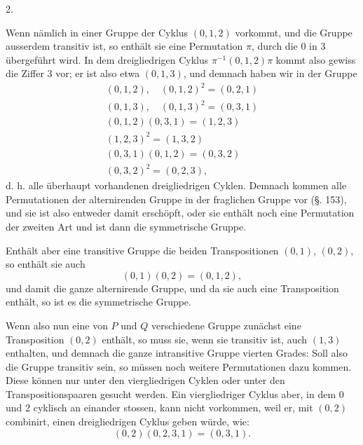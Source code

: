 
2. 

Wenn nämlich in einer Gruppe der Cyklus $(0,1,2)$ vorkommt, und die Gruppe ausserdem transitiv ist, so enthält sie eine Permutation $\pi$, durch die 0 in 3 übergeführt wird. In dem dreigliedrigen Cyklus $\pi^{-1}(0,1,2)\pi$ kommt also gewiss die Ziffer 3 vor; er ist also etwa $(0,1,3)$, und demnach haben wir in der Gruppe
\[
\begin{gathered}
(0,1,2), \quad (0,1,2)^2 = (0,2,1) \\
(0,1,3), \quad (0,1,3)^2 = (0,3,1) \\
(0,1,2)(0,3,1) = (1,2,3) \\
(1,2,3)^2 = (1,3,2) \\
(0,3,1)(0,1,2) = (0,3,2) \\
(0,3,2)^2 = (0,2,3),
\end{gathered}
\]
d. h. alle überhaupt vorhandenen dreigliedrigen Cyklen. Demnach kommen alle Permutationen der alternirenden Gruppe in der fraglichen Gruppe vor (§. 153), und sie ist also entweder damit erschöpft, oder sie enthält noch eine Permutation der zweiten Art und ist dann die symmetrische Gruppe.

Enthält aber eine transitive Gruppe die beiden Transpositionen $(0,1)$, $(0,2)$, so enthält sie auch
\[
(0,1)(0,2) = (0,1,2),
\]
und damit die ganze alternirende Gruppe, und da sie auch eine Transposition enthält, so ist es die symmetrische Gruppe.

Wenn also nun eine von $P$ und $Q$ verschiedene Gruppe zunächst eine Transposition $(0,2)$ enthält, so muss sie, wenn sie transitiv ist, auch $(1,3)$ enthalten, und demnach die ganze intransitive Gruppe vierten Grades:
Soll also die Gruppe transitiv sein, so müssen noch weitere Permutationen dazu kommen. Diese können nur unter den viergliedrigen Cyklen oder unter den Transpositionspaaren gesucht werden. Ein viergliedriger Cyklus aber, in dem 0 und 2 cyklisch an einander stossen, kann nicht vorkommen, weil er, mit $(0,2)$ combinirt, einen dreigliedrigen Cyklus geben würde, wie:
\[
(0,2)(0,2,3,1) = (0,3,1).
\]
